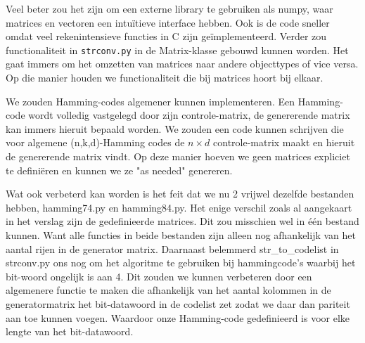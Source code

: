 \documentclass[a4paper]{article}
\begin{document}
Veel beter zou het zijn om een externe library te gebruiken als numpy, waar matrices en vectoren een intuïtieve interface hebben. Ook is de code sneller omdat veel rekenintensieve functies in C zijn geïmplementeerd. Verder zou functionaliteit in \texttt{strconv.py} in de Matrix-klasse gebouwd kunnen worden. Het gaat immers om het omzetten van matrices naar andere objecttypes of vice versa. Op die manier houden we functionaliteit die bij matrices hoort bij elkaar.

We zouden Hamming-codes algemener kunnen implementeren. Een Hamming-code wordt volledig vastgelegd door zijn controle-matrix, de genererende matrix kan immers hieruit bepaald worden. We zouden een code kunnen schrijven die voor algemene (n,k,d)-Hamming codes de \(n \times d\) controle-matrix maakt en hieruit de genererende matrix vindt. Op deze manier hoeven we geen matrices expliciet te definiëren en kunnen we ze "as needed" genereren.

Wat ook verbeterd kan worden is het feit dat we nu 2 vrijwel dezelfde bestanden hebben, hamming74.py en hamming84.py. Het enige verschil zoals al aangekaart in het verslag zijn de gedefinieerde matrices. Dit zou misschien wel in \'e\'en bestand kunnen. Want alle functies in beide bestanden zijn alleen nog afhankelijk van het aantal rijen in de generator matrix. Daarnaast belemmerd str\_to\_codelist in strconv.py ons nog om het algoritme te gebruiken bij hammingcode's waarbij het bit-woord ongelijk is aan 4. Dit zouden we kunnen verbeteren door een algemenere functie te maken die afhankelijk van het aantal kolommen in de generatormatrix het bit-datawoord in de codelist zet zodat we daar dan pariteit aan toe kunnen voegen. Waardoor onze Hamming-code gedefinieerd is voor elke lengte van het bit-datawoord.
\end{document}
